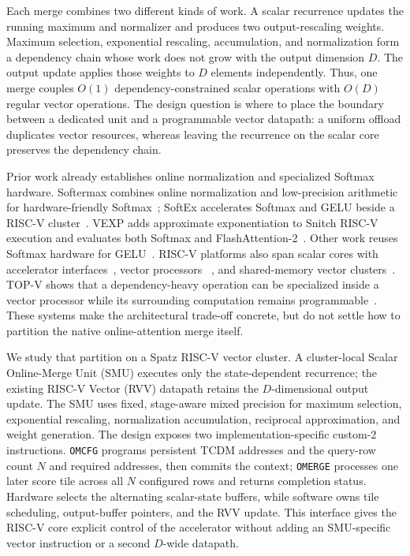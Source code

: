 \documentclass[journal]{IEEEtran}
\begin{document}
Each merge combines two different kinds of work. A scalar recurrence updates
the running maximum and normalizer and produces two output-rescaling weights.
Maximum selection, exponential rescaling, accumulation, and normalization
form a dependency chain whose work does not grow with the output dimension
$D$. The output update applies those weights to $D$ elements independently.
Thus, one merge couples $O(1)$ dependency-constrained scalar operations with
$O(D)$ regular vector operations. The design question is where to place the
boundary between a dedicated unit and a programmable vector datapath: a
uniform offload duplicates vector resources, whereas leaving the recurrence on
the scalar core preserves the dependency chain.

Prior work already establishes online normalization and specialized Softmax
hardware. Softermax combines online normalization and low-precision arithmetic
for hardware-friendly Softmax~\cite{stevens2021softermax}; SoftEx accelerates
Softmax and GELU beside a RISC-V cluster~\cite{belano2025softex}. VEXP adds
approximate exponentiation to Snitch RISC-V execution and evaluates both
Softmax and FlashAttention-2~\cite{wang2025vexp}. Other work reuses Softmax
hardware for GELU~\cite{peltekis2024gelu}. RISC-V platforms also span scalar
cores with accelerator interfaces~\cite{zaruba2021snitch}, vector processors
~\cite{cavalcante2020ara}, and shared-memory vector clusters~\cite{Spatz2025}.
TOP-V shows that a dependency-heavy operation can be specialized inside a
vector processor while its surrounding computation remains
programmable~\cite{chen2026topv}. These systems make the architectural
trade-off concrete, but do not settle how to partition the native
online-attention merge itself.

We study that partition on a Spatz RISC-V vector cluster. A cluster-local
Scalar Online-Merge Unit (SMU) executes only the state-dependent recurrence;
the existing RISC-V Vector (RVV) datapath retains the $D$-dimensional output
update. The SMU uses fixed, stage-aware mixed precision for maximum selection,
exponential rescaling, normalization accumulation, reciprocal approximation,
and weight generation. The design exposes two implementation-specific
custom-2 instructions. \texttt{OMCFG} programs persistent TCDM addresses and
the query-row count $N$ and required addresses, then commits the context;
\texttt{OMERGE} processes one later score tile across all $N$ configured rows
and returns completion status. Hardware selects
the alternating scalar-state buffers, while software owns tile scheduling,
output-buffer pointers, and the RVV update. This interface gives the RISC-V
core explicit control of the accelerator without adding an SMU-specific vector
instruction or a second $D$-wide datapath.
\end{document}
